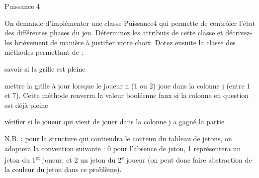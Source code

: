 \begin{Exercice}{Puissance 4}
	
	On demande d’implémenter une classe Puissance4 qui permette de contrôler
	l’état des différentes phases du jeu. Déterminez les attributs de cette
	classe et décrivez-les brièvement de manière à justifier votre choix.
	Dotez ensuite la classe des méthodes permettant de :

	\begin{liste}
		\item 
			savoir si la grille est pleine
		\item 
			mettre la grille à jour lorsque le joueur n (1 ou 2) joue dans la
			colonne j (entre 1 et 7). Cette méthode renverra la valeur booléenne
			faux si la colonne en question est déjà pleine
		\item 
			vérifier si le joueur qui vient de jouer dans la colonne j a gagné la
			partie
	\end{liste}
	
	N.B. : pour la structure qui contiendra le contenu du tableau de jetons,
	on adoptera la convention suivante : 0 pour l’absence de jeton, 1
	représentera un jeton du 1\textsuperscript{er} joueur, et 2 un jeton du
	2\textsuperscript{e} joueur (on peut donc faire abstraction de la
	couleur du jeton dans ce problème).
\end{Exercice}


